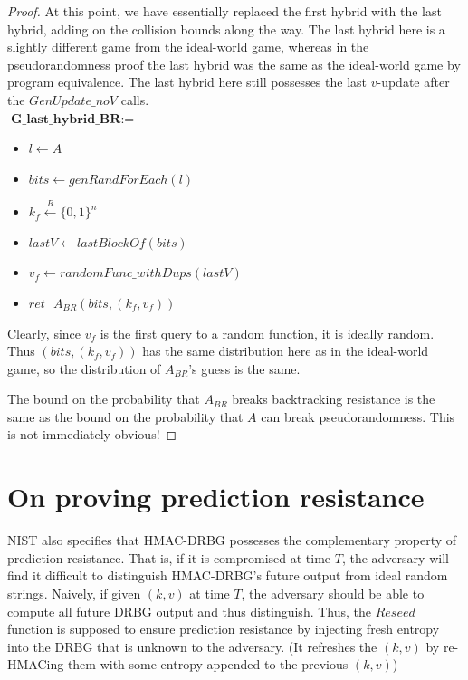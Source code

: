 \documentclass[12pt,lot, lof]{puthesis}
\newenvironment{game}
{ \begin{itemize}[noitemsep,nolistsep] 
}
{ \end{itemize}                  }
\newcommand{\s} {\textrm{ }}
\newcommand{\samp}{\xleftarrow{R} \{0,1\}}
\newcommand{\lar}{\leftarrow}
\begin{document}
{\begin{proof}
At this point, we have essentially replaced the first hybrid with the last hybrid, adding on the collision bounds along the way. The last hybrid here is a slightly different game from the ideal-world game, whereas in the pseudorandomness proof the last hybrid was the same as the ideal-world game by program equivalence. The last hybrid here still possesses the last $v$-update after the $GenUpdate\_noV$ calls.\\

$\textbf{G\_last\_hybrid\_BR} := $
\begin{game}
\item[] $l \leftarrow A$ 
\item[] $bits \leftarrow genRandForEach(l)$
\item[] $k_f \samp^n$
\item[] $lastV \lar lastBlockOf(bits)$
\item[] $v_f \lar randomFunc\_withDups(lastV)$
\item[] $ret \s A_{BR}(bits, (k_f,v_f))$ \\
\end{game}

Clearly, since $v_f$ is the first query to a random function, it is ideally random. Thus $(bits, (k_f, v_f))$ has the same distribution here as in the ideal-world game, so the distribution of $A_{BR}$'s guess is the same.

The bound on the probability that $A_{BR}$ breaks backtracking resistance is the same as the bound on the probability that $A$ can break pseudorandomness. This is not immediately obvious!

\end{proof}

\section{On proving prediction resistance}

NIST also specifies that HMAC-DRBG possesses the complementary property of prediction resistance. That is, if it is compromised at time $T$, the adversary will find it difficult to distinguish HMAC-DRBG's future output from ideal random strings. Naively, if given $(k, v)$ at time $T$, the adversary should be able to compute all future DRBG output and thus distinguish. Thus, the $Reseed$ function is supposed to ensure prediction resistance by injecting fresh entropy into the DRBG that is unknown to the adversary. (It refreshes the $(k,v)$ by re-HMACing them with some entropy appended to the previous $(k,v)$)

}
\end{document}
